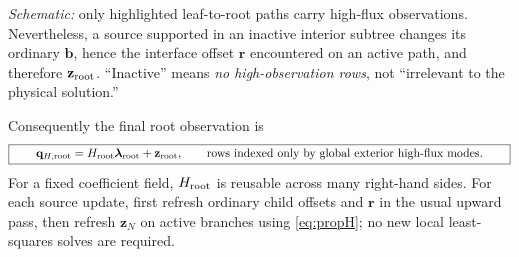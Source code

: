\documentclass[11pt,letterpaper]{article}
\newcommand{\lam}{\boldsymbol\lambda}
\newcommand{\bb}{\mathbf b}
\newcommand{\zz}{\mathbf z}
\begin{document}
\begin{center}
\end{center}
\vspace{-0.4em}
\noindent\emph{Schematic:} only highlighted leaf-to-root paths carry high-flux observations. Nevertheless, a source supported in an inactive interior subtree changes its ordinary \(\bb\), hence the interface offset \(\mathbf r\) encountered on an active path, and therefore \(\zz_{\rm root}\). ``Inactive'' means \emph{no high-observation rows}, not ``irrelevant to the physical solution.''

Consequently the final root observation is
\begin{equation}\label{eq:rootH}
 \boxed{\qquad
 \mathbf q_{H,\rm root}=H_{\rm root}\lam_{\rm root}+\zz_{\rm root},\qquad
 \text{rows indexed only by global exterior high-flux modes}.\qquad}
\end{equation}
For a fixed coefficient field, \(H_{\rm root}\) is reusable across many right-hand sides. For each source update, first refresh ordinary child offsets and \(\mathbf r\) in the usual upward pass, then refresh \(\zz_N\) on active branches using \eqref{eq:propH}; no new local least-squares solves are required.
\end{document}
